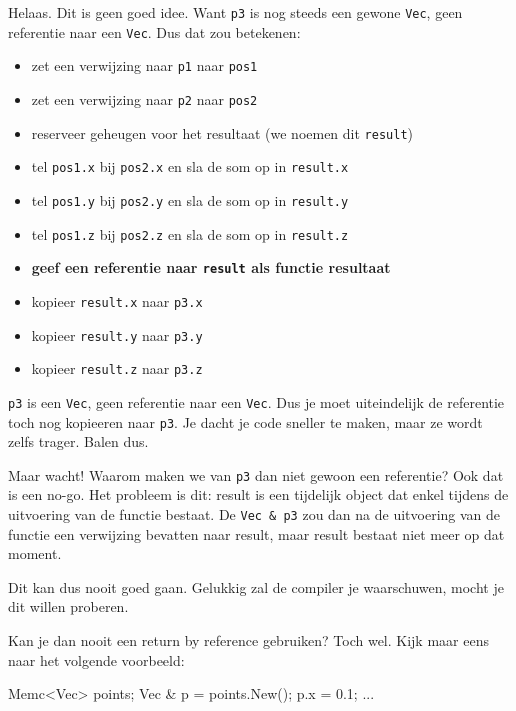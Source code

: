 Helaas. Dit is geen goed idee. Want \texttt{p3} is nog steeds een gewone \texttt{Vec}, geen referentie naar een \texttt{Vec}. Dus dat zou betekenen:

\begin{itemize}
\item zet een verwijzing naar \texttt{p1} naar \texttt{pos1}
\item zet een verwijzing naar \texttt{p2} naar \texttt{pos2}
\item reserveer geheugen voor het resultaat (we noemen dit \texttt{result})
\item tel \texttt{pos1.x} bij \texttt{pos2.x} en sla de som op in \texttt{result.x}
\item tel \texttt{pos1.y} bij \texttt{pos2.y} en sla de som op in \texttt{result.y}
\item tel \texttt{pos1.z} bij \texttt{pos2.z} en sla de som op in \texttt{result.z}
\item \textbf{geef een referentie naar \texttt{result} als functie resultaat}
\item kopieer \texttt{result.x} naar \texttt{p3.x}
\item kopieer \texttt{result.y} naar \texttt{p3.y}
\item kopieer \texttt{result.z} naar \texttt{p3.z}

\end{itemize}

\texttt{p3} is een \texttt{Vec}, geen referentie naar een \texttt{Vec}. Dus je moet uiteindelijk de referentie toch nog kopieeren naar \texttt{p3}. Je dacht je code sneller te maken, maar ze wordt zelfs trager. Balen dus.

Maar wacht! Waarom maken we van \texttt{p3} dan niet gewoon een referentie? Ook dat is een no-go. Het probleem is dit: result is een tijdelijk object dat enkel tijdens de uitvoering van de functie bestaat. De \texttt{Vec \& p3} zou dan na de uitvoering van de functie een verwijzing bevatten naar result, maar result bestaat niet meer op dat moment.

Dit kan dus nooit goed gaan. Gelukkig zal de compiler je waarschuwen, mocht je dit willen proberen.

Kan je dan nooit een return by reference gebruiken? Toch wel. Kijk maar eens naar het volgende voorbeeld:

\begin{code}
Memc<Vec> points;
Vec & p = points.New();
p.x = 0.1;
...
\end{code}

